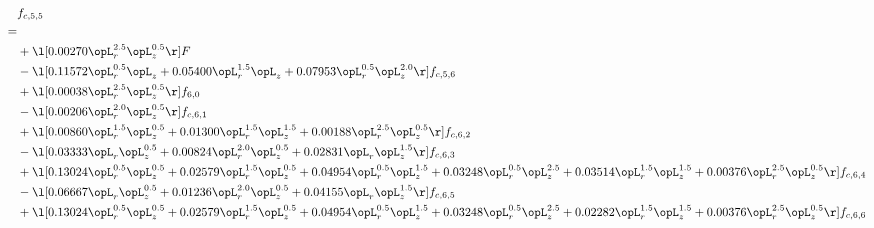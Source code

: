 \begin{alignat}{2} 
\label{eq:f_55_2} 
& f_{c,5,5} \nonumber \\ 
 = \\ 
& + \l[  0.00270 \opL_r^{2.5} \opL_z^{0.5}  \r] F \nonumber \\ 
& - \l[  0.11572 \opL_r^{0.5} \opL_z +  0.05400 \opL_r^{1.5} \opL_z +  0.07953 \opL_r^{0.5} \opL_z^{2.0}  \r] f_{c,5,6} \nonumber \\ 
& + \l[  0.00038 \opL_r^{2.5} \opL_z^{0.5}  \r] f_{6,0} \nonumber \\ 
& - \l[  0.00206 \opL_r^{2.0} \opL_z^{0.5}  \r] f_{c,6,1} \nonumber \\ 
& + \l[  0.00860 \opL_r^{1.5} \opL_z^{0.5} +  0.01300 \opL_r^{1.5} \opL_z^{1.5} +  0.00188 \opL_r^{2.5} \opL_z^{0.5}  \r] f_{c,6,2} \nonumber \\ 
& - \l[  0.03333 \opL_r \opL_z^{0.5} +  0.00824 \opL_r^{2.0} \opL_z^{0.5} +  0.02831 \opL_r \opL_z^{1.5}  \r] f_{c,6,3} \nonumber \\ 
& + \l[  0.13024 \opL_r^{0.5} \opL_z^{0.5} +  0.02579 \opL_r^{1.5} \opL_z^{0.5} +  0.04954 \opL_r^{0.5} \opL_z^{1.5} +  0.03248 \opL_r^{0.5} \opL_z^{2.5} +  0.03514 \opL_r^{1.5} \opL_z^{1.5} +  0.00376 \opL_r^{2.5} \opL_z^{0.5}  \r] f_{c,6,4} \nonumber \\ 
& - \l[  0.06667 \opL_r \opL_z^{0.5} +  0.01236 \opL_r^{2.0} \opL_z^{0.5} +  0.04155 \opL_r \opL_z^{1.5}  \r] f_{c,6,5} \nonumber \\ 
& + \l[  0.13024 \opL_r^{0.5} \opL_z^{0.5} +  0.02579 \opL_r^{1.5} \opL_z^{0.5} +  0.04954 \opL_r^{0.5} \opL_z^{1.5} +  0.03248 \opL_r^{0.5} \opL_z^{2.5} +  0.02282 \opL_r^{1.5} \opL_z^{1.5} +  0.00376 \opL_r^{2.5} \opL_z^{0.5}  \r] f_{c,6,6} \nonumber \\ 
\end{alignat} 


